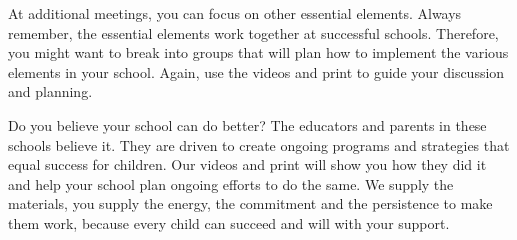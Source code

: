 At additional meetings, you can focus on other essential elements.
Always remember, the essential elements work together at successful schools.
Therefore, you might want to break into groups that will plan how to implement the various elements in your school.
Again, use the videos and print to guide your discussion and planning.

Do you believe your school can do better? The educators and parents in these schools believe it.
They are driven to create ongoing programs and strategies that equal success for children.
Our videos and print will show you how they did it and help your school plan ongoing efforts to do the same.
We supply the materials, you supply the energy, the commitment and the persistence to make them work, because every child can succeed and will with your support.
